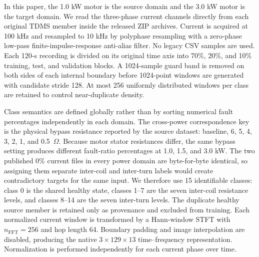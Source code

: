 \documentclass[conference,letterpaper]{IEEEtran}\IEEEoverridecommandlockouts
\begin{document}
In this paper, the 1.0 kW motor is the source domain and the 3.0 kW motor is the target domain. We read the three-phase current channels directly from each original TDMS member inside the released ZIP archives. Current is acquired at 100 kHz and resampled to 10 kHz by polyphase resampling with a zero-phase low-pass finite-impulse-response anti-alias filter. No legacy CSV samples are used. Each 120-s recording is divided on its original time axis into 70\%, 20\%, and 10\% training, test, and validation blocks. A 1024-sample guard band is removed on both sides of each internal boundary before 1024-point windows are generated with candidate stride 128. At most 256 uniformly distributed windows per class are retained to control near-duplicate density.

Class semantics are defined globally rather than by sorting numerical fault percentages independently in each domain. The cross-power correspondence key is the physical bypass resistance reported by the source dataset: baseline, 6, 5, 4, 3, 2, 1, and 0.5~$\Omega$. Because motor stator resistances differ, the same bypass setting produces different fault-ratio percentages at 1.0, 1.5, and 3.0 kW. The two published 0\% current files in every power domain are byte-for-byte identical, so assigning them separate inter-coil and inter-turn labels would create contradictory targets for the same input. We therefore use 15 identifiable classes: class 0 is the shared healthy state, classes 1--7 are the seven inter-coil resistance levels, and classes 8--14 are the seven inter-turn levels. The duplicate healthy source member is retained only as provenance and excluded from training. Each normalized current window is transformed by a Hann-window STFT with $n_{\mathrm{FFT}}=256$ and hop length 64. Boundary padding and image interpolation are disabled, producing the native $3\times129\times13$ time--frequency representation. Normalization is performed independently for each current phase over time.
\end{document}
